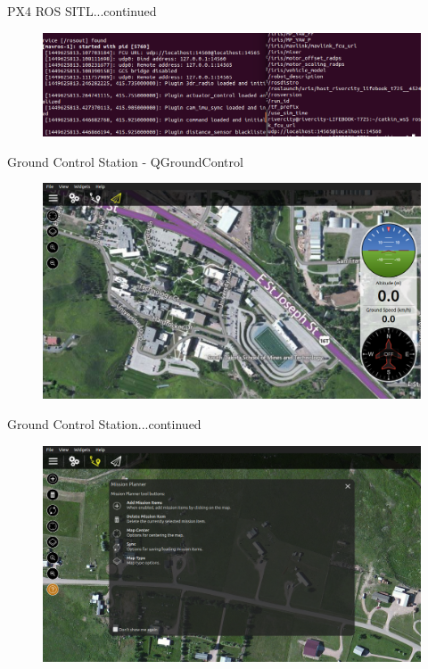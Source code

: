 \documentclass[11pt]{beamer}
\begin{document}
\begin{frame}{PX4 ROS SITL...continued}
\begin{figure}
\includegraphics[width=1\textwidth]{images/params}
\end{figure}
\end{frame}

\begin{frame}{Ground Control Station - QGroundControl}
\begin{figure}
\includegraphics[width=1\textwidth]{images/qgroundcontrol}
\end{figure}
\end{frame}

\begin{frame}{Ground Control Station...continued}
\begin{figure}
\includegraphics[width=1\textwidth]{images/selectmission}
\end{figure}
\end{frame}
\end{document}
